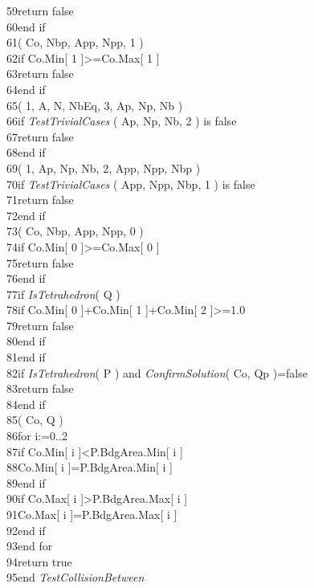 \documentclass[12pt, a4paper]{article}
\begin{document}
\begin{ttfamily}
59\quad\quad\quad return false\\
60\quad\quad end if\\
61\quad{}( Co, Nbp, App, Npp, 1 )\\
62\quad\quad if Co.Min[ 1 ]>=Co.Max[ 1 ]\\
63\quad\quad\quad return false\\
64\quad\quad end if\\
65\quad{}( 1, A, N, NbEq, 3, Ap, Np, Nb )\\
66\quad\quad if {\em TestTrivialCases} ( Ap, Np, Nb, 2 ) is false\\
67\quad\quad\quad return false\\
68\quad\quad end if\\
69\quad{}( 1, Ap, Np, Nb, 2, App, Npp, Nbp )\\
70\quad\quad if {\em TestTrivialCases} ( App, Npp, Nbp, 1 ) is false\\
71\quad\quad\quad return false\\
72\quad\quad end if\\
73\quad{}( Co, Nbp, App, Npp, 0 )\\
74\quad\quad if Co.Min[ 0 ]>=Co.Max[ 0 ]\\
75\quad\quad\quad return false\\
76\quad\quad end if\\
77\quad\quad if {\em IsTetrahedron}( Q )\\
78\quad\quad\quad if Co.Min[ 0 ]+Co.Min[ 1 ]+Co.Min[ 2 ]>=1.0\\
79\quad\quad\quad\quad return false\\
80\quad\quad\quad end if\\
81\quad\quad end if\\
82\quad\quad if {\em IsTetrahedron}( P ) and {\em ConfirmSolution}( Co, Qp )=false\\
83\quad\quad\quad return false\\
84\quad\quad end if\\
85\quad{}( Co, Q )\\
86\quad\quad for i:=0..2\\
87\quad\quad\quad if Co.Min[ i ]<P.BdgArea.Min[ i ]\\
88\quad\quad\quad\quad Co.Min[ i ]=P.BdgArea.Min[ i ]\\
89\quad\quad\quad end if\\
90\quad\quad\quad if Co.Max[ i ]>P.BdgArea.Max[ i ]\\
91\quad\quad\quad\quad Co.Max[ i ]=P.BdgArea.Max[ i ]\\
92\quad\quad\quad end if\\
93\quad\quad end for\\
94\quad\quad return true\\
95\quad end {\em TestCollisionBetween}\\
\end{ttfamily}
\end{document}
